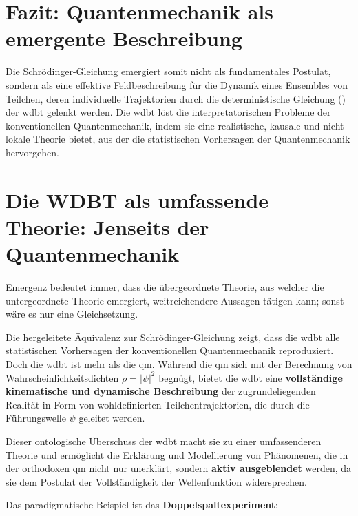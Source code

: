 \section{Fazit: Quantenmechanik als emergente Beschreibung}
Die Schrödinger-Gleichung emergiert somit nicht als fundamentales Postulat, sondern als eine effektive Feldbeschreibung für die Dynamik eines Ensembles von Teilchen, deren individuelle Trajektorien
durch die deterministische Gleichung () der \gls{wdbt} gelenkt werden. Die \gls{wdbt} löst die interpretatorischen Probleme der konventionellen
Quantenmechanik, indem sie eine realistische, kausale und nicht-lokale Theorie bietet, aus der die statistischen Vorhersagen der Quantenmechanik hervorgehen.

\section{Die WDBT als umfassende Theorie: Jenseits der Quantenmechanik}
Emergenz bedeutet immer, dass die übergeordnete Theorie, aus welcher die untergeordnete Theorie emergiert, weitreichendere Aussagen tätigen kann; sonst wäre es nur eine Gleichsetzung.

Die hergeleitete Äquivalenz zur Schrödinger-Gleichung zeigt, dass die \gls{wdbt} alle statistischen Vorhersagen der konventionellen Quantenmechanik reproduziert. Doch die \gls{wdbt} ist mehr als die \gls{qm}.
Während die \gls{qm} sich mit der Berechnung von Wahrscheinlichkeitsdichten $\rho = \left| \psi \right|^2$ begnügt, bietet die \gls{wdbt} eine \textbf{vollständige kinematische und dynamische Beschreibung}
der zugrundeliegenden Realität in Form von wohldefinierten Teilchentrajektorien, die durch die Führungswelle $\psi$ geleitet werden.

Dieser ontologische Überschuss der \gls{wdbt} macht sie zu einer umfassenderen Theorie und ermöglicht die Erklärung und Modellierung von Phänomenen, die in der orthodoxen \gls{qm} nicht nur unerklärt,
sondern \textbf{aktiv ausgeblendet} werden, da sie dem Postulat der Vollständigkeit der Wellenfunktion widersprechen.

Das paradigmatische Beispiel ist das \textbf{Doppelspaltexperiment}:

